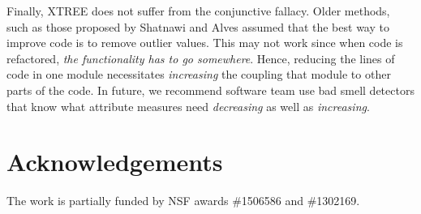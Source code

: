 \documentclass[twocolumn,5p]{elsarticle}
\newcommand{\fig}[1]{Figure~\ref{fig:#1}}
\theoremstyle{break}
\begin{document}
		Finally, XTREE does not suffer from the conjunctive fallacy.
		Older methods, such as those proposed by  Shatnawi and Alves assumed
		that the best way to improve code is to remove outlier  values. This may not work since when code is refactored,
		{\em the functionality has to go somewhere}. Hence,  reducing the lines of code in one module necessitates   
		{\em increasing} the coupling that module
		to other parts of the code. In future, we recommend software team use bad smell detectors that know what attribute measures
		need {\em decreasing} as well as {\em increasing}.
		
		
		
		
		\section*{Acknowledgements}
		The work is partially funded by NSF  awards \#1506586 and \#1302169.
		
		\balance
		
		
	
\end{document}
